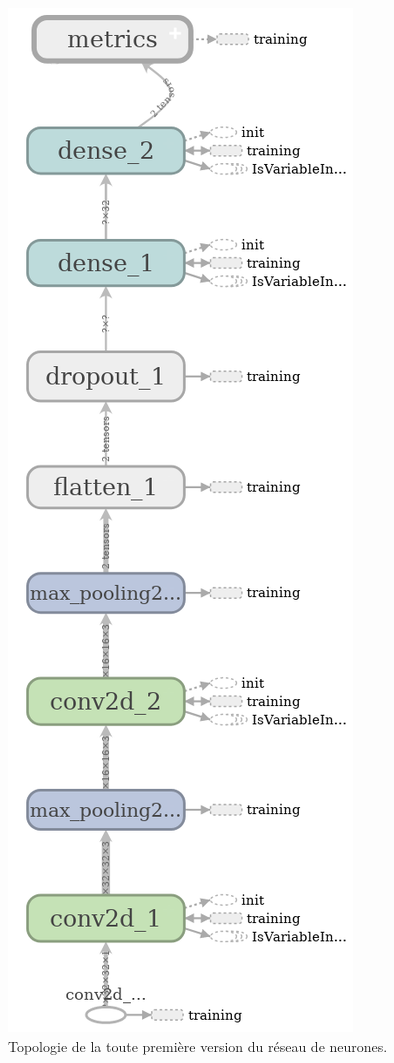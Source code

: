 \documentclass[a4paper, 11pt]{report}
\begin{document}
\begin{figure}
	\centering
	\includegraphics[height=0.7\textheight]{img/net1.png}
	\caption{Topologie de la toute première version du réseau de neurones.}
	\label{net1}
\end{figure}
\end{document}
